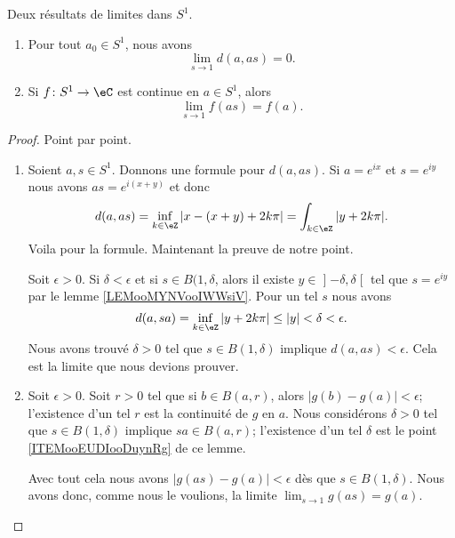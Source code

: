 \begin{lemma}        \label{LEMooTKFHooJaeMyc}
    Deux résultats de limites dans \( S^1\).
    \begin{enumerate}
        \item       \label{ITEMooEUDIooDuynRg}
            Pour tout \( a_0\in S^1\), nous avons
            \begin{equation}
                \lim_{s\to 1} d(a,as)=0.
            \end{equation}
        \item       \label{ITEMooXCBUooUxQldB}
            Si \( f\colon S^1\to \eC\) est continue en \( a\in S^1\), alors 
            \begin{equation}
                \lim_{s\to 1} f(as)=f(a).
            \end{equation}
    \end{enumerate}
\end{lemma}

\begin{proof}
    Point par point.
    \begin{enumerate}
        \item
            Soient \( a,s\in S^1\). Donnons une formule pour \( d(a,as)\). Si \( a= e^{ix}\) et \( s= e^{iy}\) nous avons \( as= e^{i(x+y)}\) et donc
            \begin{equation}
                d(a,as)=\inf_{k\in \eZ}| x-(x+y)+2k\pi |=\int_{k\in \eZ}| y+2k\pi |.
            \end{equation}
            Voila pour la formule. Maintenant la preuve de notre point.

            Soit \( \epsilon>0\). Si \( \delta<\epsilon\) et si \( s\in B(1,\delta\), alors il existe \( y\in \mathopen] -\delta , \delta \mathclose[\) tel que \( s= e^{iy}\) par le lemme \ref{LEMooMYNVooIWWsiV}. Pour un tel \( s\) nous avons
                \begin{equation}
                    d(a,sa)=\inf_{k\in \eZ}| y+2k\pi |\leq | y |<\delta<\epsilon.
                \end{equation}
                Nous avons trouvé \( \delta>0\) tel que \( s\in B(1,\delta)\) implique \( d(a,as)<\epsilon\). Cela est la limite que nous devions prouver.
            \item
                Soit \( \epsilon>0\). Soit \( r>0\) tel que si \( b\in B(a,r)\), alors \( | g(b)-g(a) |<\epsilon\); l'existence d'un tel \( r\) est la continuité de \( g\) en \( a\). Nous considérons \( \delta>0\) tel que \( s\in B(1,\delta)\) implique \( sa\in B(a,r)\); l'existence d'un tel \( \delta\) est le point \ref{ITEMooEUDIooDuynRg} de ce lemme.

                Avec tout cela nous avons \( | g(as)-g(a) |<\epsilon\) dès que \( s\in B(1,\delta)\). Nous avons donc, comme nous le voulions, la limite \( \lim_{s\to 1} g(as)=g(a)\).
    \end{enumerate}
\end{proof}

